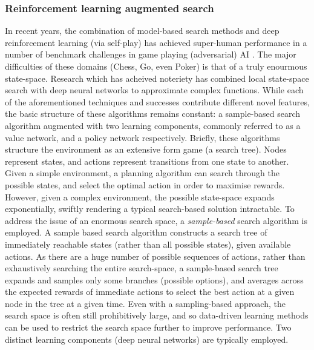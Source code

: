 \subsubsection{Reinforcement learning augmented search} \label{RL + Search}
In recent years, the combination of model-based search methods and deep reinforcement learning (via self-play) has achieved super-human performance in a number of benchmark challenges in game playing (adversarial) AI \cite{AlphaGo,Brown2020,Lerer2019}. 
The major difficulties of these domains (Chess, Go, even Poker) is that of a truly enourmous state-space. Research which has acheived noteriety has combined local state-space search with deep neural networks to approximate complex functions. 
\newline \newline
While each of the aforementioned techniques and successes contribute different novel features, the basic structure of these algorithms remains constant: a sample-based search algorithm augmented with two learning components, commonly referred to as a value network, and a policy network respectively.
\newline \newline
Briefly, these algorithms structure the environment as an extensive form game (a search tree). Nodes represent states, and actions represent transitions from one state to another. Given a simple environment, a planning algorithm can search through the possible states, and select the optimal action in order to maximise rewards. However, given a complex environment, the possible state-space expands exponentially, swiftly rendering a typical search-based solution intractable. To address the issue of an enormous search space, a \textit{sample-based} search algorithm is employed. 
\newline \newline
A sample based search algorithm constructs a search tree of immediately reachable states (rather than all possible states), given available actions. As there are a huge number of possible sequences of actions, rather than exhaustively searching the entire search-space, a sample-based search tree expands and samples only some branches (possible options), and averages across the expected rewards of immediate actions to select the best action at a given node in the tree at a given time.
\newline \newline
Even with a sampling-based approach, the search space is often still prohibitively large, and so data-driven learning methods can be used to restrict the search space further to improve performance. Two distinct learning components (deep neural networks) are typically employed.  
